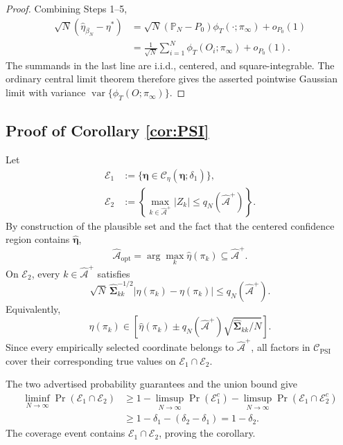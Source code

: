 \documentclass[12pt]{article}
\theoremstyle{remark}\newtheorem{remark}[theorem]{Remark}\theoremstyle{plain}
\newcommand{\var}{\operatorname{var}}
\begin{document}
\begin{proof}
    Combining Steps 1--5,
    \[
        \begin{aligned}
        \sqrt N(\widehat\eta_{\beta_N}-\eta^*)
        &=
        \sqrt N(\mathbb P_N-P_0)
        \phi_T(\cdot;\pi_\infty)+o_{P_0}(1)\\
        &=
        \frac1{\sqrt N}\sum_{i=1}^N
        \phi_T(O_i;\pi_\infty)+o_{P_0}(1).
        \end{aligned}
    \]
    The summands in the last line are i.i.d., centered, and
    square-integrable.  The ordinary central limit theorem therefore
    gives the asserted pointwise Gaussian limit with variance
    $\var\{\phi_T(O;\pi_\infty)\}$.
\end{proof}

\subsection{Proof of Corollary \ref{cor:PSI}}

Let
\[
    \begin{aligned}
    \mathcal E_1
    &:=
    \{\bm\eta\in
    \mathcal C_\eta(\widehat{\bm\eta};\delta_1)\},\\
    \mathcal E_2
    &:=
    \left\{
    \max_{k\in\widehat{\mathcal A}^{+}}|Z_k|
    \leq
    q_N(\widehat{\mathcal A}^{+})\right\}.
    \end{aligned}
\]
By construction of the plausible set and the fact that the centered
confidence region contains $\widehat{\bm\eta}$,
\[
    \widehat{\mathcal A}_{\mathrm{opt}}
    =\arg\max_k\widehat\eta(\pi_k)
    \subseteq\widehat{\mathcal A}^{+}.
\]
On $\mathcal E_2$, every $k\in\widehat{\mathcal A}^{+}$ satisfies
\[
    \sqrt N\,
    \widehat{\boldsymbol\Sigma}_{kk}^{-1/2}
    |\widehat\eta(\pi_k)-\eta(\pi_k)|
    \leq
    q_N(\widehat{\mathcal A}^{+}).
\]
Equivalently,
\[
    \eta(\pi_k)\in
    \left[
    \widehat\eta(\pi_k)\pm
    q_N(\widehat{\mathcal A}^{+})
    \sqrt{\widehat{\boldsymbol\Sigma}_{kk}/N}
    \right].
\]
Since every empirically selected coordinate belongs to
$\widehat{\mathcal A}^{+}$, all factors in
$\mathcal C_{\mathrm{PSI}}$ cover their corresponding true values on
$\mathcal E_1\cap\mathcal E_2$.

The two advertised probability guarantees and the union bound give
\[
    \begin{aligned}
    \liminf_{N\to\infty}\Pr(\mathcal E_1\cap\mathcal E_2)
    &\geq
    1-\limsup_{N\to\infty}\Pr(\mathcal E_1^c)
      -\limsup_{N\to\infty}
       \Pr(\mathcal E_1\cap\mathcal E_2^c)\\
    &\geq
    1-\delta_1-(\delta_2-\delta_1)
    =1-\delta_2.
    \end{aligned}
\]
The coverage event contains $\mathcal E_1\cap\mathcal E_2$, proving
the corollary.
\end{document}
